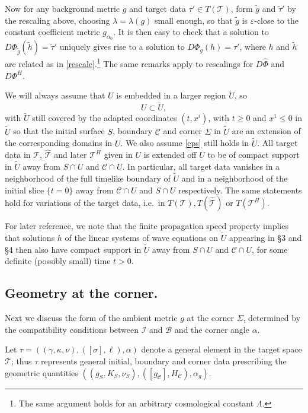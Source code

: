 \documentclass[10pt]{amsart}
\renewcommand{\a}{\alpha}
\newcommand{\g}{\gamma}
\newcommand{\e}{\varepsilon}
\newcommand{\s}{\sigma}
\newcommand{\Si}{\Sigma}
\renewcommand{\k}{\kappa}
\renewcommand{\l}{\lambda}
\newcommand{\cC}{{\mathcal C}}
\newcommand{\cT}{{\mathcal T}}
\newcommand{\cB}{{\mathcal B}}
\newcommand{\cI}{\mathcal I}
\renewcommand{\hat}{\widehat}
\newcommand{\<}{\langle}
\renewcommand{\>}{\rangle}
\newcommand{\w}{\widetilde}
\theoremstyle{plain}
\theoremstyle{remark}
\theoremstyle{definition}
\numberwithin{equation}{section}
\begin{document}
  Now for any background metric $g$ and target data $\tau' \in T(\cT)$, form $\w g$ and $\w \tau'$ by the rescaling 
above, choosing $\l = \l(g)$ small enough, so that $\w g$ is $\e$-close to the constant coefficient metric $g_{\a_0}$. It is then easy to check 
that a solution to $D\Phi_{\w g}(\w h)=\w \tau'$ uniquely gives rise to a solution to $D\Phi_g(h)=\tau'$, where $h$ and $\w h$ 
are related as in \eqref{rescale}.\footnote{The same argument holds for an arbitrary cosmological constant $\Lambda$.} The same 
remarks apply to rescalings for $D\hat \Phi$ and $D \Phi^H$. 

\medskip 
 
  We will always assume that $U$ is embedded in a larger region $\w U$, so 
$$U \subset \w U,$$
with $\w U$ still covered by the adapted coordinates $(t, x^i)$, with $t \geq 0$ and $x^1 \leq 0$ in $\w U$ so that the initial surface $S$, boundary 
$\cC$ and corner $\Si$ in $\w U$ are an extension of the corresponding domains in $U$. We also assume \eqref{eps} still holds in $\w U$. 
All target data in $\cT$, $\hat \cT$ and later $\cT^H$ given in $U$ is extended off $U$ to be of compact support in $\w U$ away 
from $S\cap U$ and $\cC \cap U$. In particular, all target data vanishes in a neighborhood of the full timelike boundary of $\w U$ and in 
a neighborhood of the initial slice $\{t = 0\}$ away from $\cC \cap U$ and $S \cap U$ respectively. The same statements hold for variations of the 
target data, i.e.~in $T(\cT), T(\hat \cT)$ or $T(\cT^H)$. 

   For later reference, we note that the finite propagation speed property implies that solutions $h$ of the linear systems of wave equations on $\w U$ 
appearing in \S 3 and \S 4 then also have compact support in $\w U$ away from $S\cap U$ and $\cC \cap U$, for some definite (possibly small) time 
$t > 0$. 


\subsection{Geometry at the corner.}
Next we discuss the form of the ambient metric $g$ at the corner $\Si$, determined by the compatibility conditions between $\cI$ and $\cB$ and 
the corner angle $\a$. 

Let $\tau = ((\g, \k, \nu), ([\s], \ell), \a)$ denote a general element in the target space $\cT$; thus $\tau$ represents general 
initial, boundary and corner data prescribing the geometric quantities $((g_S, K_S, \nu_S), ([g_{\cC}], H_{\cC}), \a_g)$. 
\end{document}
